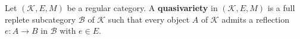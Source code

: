 Let $(\mathcal{K}, E, M)$ be a regular category. A \textbf{quasivariety} in $(\mathcal{K}, E, M)$ is a full replete subcategory $\mathcal{B}$ of $\mathcal{K}$ such that every object $A$ of $\mathcal{K}$ admits a reflection $e: A \longrightarrow B$ in $\mathcal{B}$ with $e \in E$.
